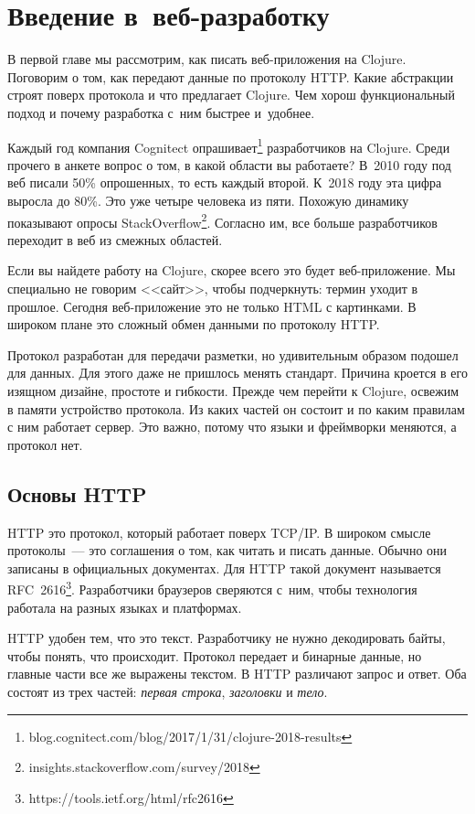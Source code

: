 \chapter{Введение в~веб-разработку}

\begin{teaser}
В первой главе мы рассмотрим, как писать веб-приложения на Clojure. Поговорим о
том, как передают данные по протоколу HTTP. Какие абстракции строят поверх
протокола и что предлагает Clojure. Чем хорош функциональный подход и почему
разработка с~ним быстрее и~удобнее.
\end{teaser}

Каждый год компания Cognitect опрашивает\footnote{blog.cognitect.com/blog/2017/1/31/clojure-2018-results}
разработчиков на Clojure. Среди прочего в анкете вопрос о том, в какой области вы работаете? В~2010 году под
веб писали 50\% опрошенных, то есть каждый второй. К~2018 году
эта цифра выросла до 80\%. Это уже четыре человека из пяти. Похожую динамику показывают
опросы StackOverflow\footnote{insights.stackoverflow.com/survey/2018}.
Согласно им, все больше разработчиков переходит в веб из смежных областей.

Если вы найдете работу на Clojure, скорее всего это будет веб-приложение. Мы
специально не говорим <<сайт>>, чтобы подчеркнуть: термин уходит в
прошлое. Сегодня веб-приложение это не только HTML с картинками. В широком плане
это сложный обмен данными по протоколу HTTP.

Протокол разработан для передачи разметки, но удивительным образом подошел для
данных. Для этого даже не пришлось менять стандарт. Причина кроется в его
изящном дизайне, простоте и гибкости. Прежде чем перейти к Clojure, освежим в
памяти устройство протокола. Из каких частей он состоит и по каким правилам с
ним работает сервер. Это важно, потому что языки и фреймворки меняются, а
протокол нет.

\section{Основы HTTP}

HTTP это протокол, который работает поверх TCP/IP. В широком смысле протоколы~---
это соглашения о том, как читать и писать данные. Обычно они записаны в официальных
документах. Для HTTP такой документ называется RFC~2616\footnote{https://tools.ietf.org/html/rfc2616}.
Разработчики браузеров сверяются с~ним, чтобы технология работала
на разных языках и платформах.

HTTP удобен тем, что это текст. Разработчику не нужно декодировать байты, чтобы
понять, что происходит. Протокол передает и бинарные данные, но главные части
все же выражены текстом. В HTTP различают запрос и ответ. Оба состоят из трех
частей: \emph{первая строка}, \emph{заголовки} и \emph{тело}.

